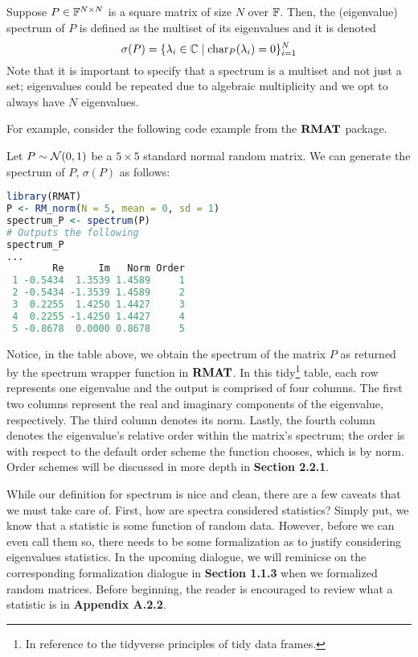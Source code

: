 \bigskip
\bigskip
\begin{definition}[Spectrum]
Suppose $P \in \mathbb{F}^{N \times N}$ is a square matrix of size $N$ over $\mathbb{F}$. Then, the (eigenvalue) spectrum of $P$ is defined as the multiset of its eigenvalues and it is denoted
$$\sigma(P) = \{\lambda_i \in \mathbb{C} \mid \text{char}_P(\lambda_i) = 0 \}_{i=1}^N$$
Note that it is important to specify that a spectrum is a multiset and not just a set; eigenvalues could be repeated due to algebraic multiplicity and we opt to always have $N$ eigenvalues.
\end{definition}

\medskip
For example, consider the following code example from the ${\textbf{RMAT}}$ package.

\begin{code}
Let $P \sim \mathcal{N}(0,1)$ be a $5 \times 5$ standard normal random matrix. We can generate the spectrum of $P$, $\sigma(P)$ as follows:
\end{code}

\begin{lstlisting}[language=R]
library(RMAT)
P <- RM_norm(N = 5, mean = 0, sd = 1)
spectrum_P <- spectrum(P)
# Outputs the following
spectrum_P
...
        Re      Im   Norm Order
 1 -0.5434  1.3539 1.4589     1
 2 -0.5434 -1.3539 1.4589     2
 3  0.2255  1.4250 1.4427     3
 4  0.2255 -1.4250 1.4427     4
 5 -0.8678  0.0000 0.8678     5
\end{lstlisting}

Notice, in the table above, we obtain the spectrum of the matrix $P$ as returned by the spectrum wrapper function in ${\textbf{RMAT}}$.
In this tidy\footnote{In reference to the tidyverse principles of tidy data frames.} table, each row represents one eigenvalue and the output is comprised of four columns.
The first two columns represent the real and imaginary components of the eigenvalue, respectively. The third column denotes its norm. Lastly, the fourth column denotes the eigenvalue's
relative order within the matrix's spectrum; the order is with respect to the default order scheme the function chooses, which is by norm. Order schemes will be discussed in more depth in \textbf{Section 2.2.1}.

\newpage


While our definition for spectrum is nice and clean, there are a few caveats that we must take care of.
First, how are spectra considered statistics? Simply put, we know that a statistic is some function of random data.
However, before we can even call them so, there needs to be some formalization as to justify considering eigenvalues statistics.
In the upcoming dialogue, we will reminicse on the corresponding formalization dialogue in \textbf{Section 1.1.3} when we formalized random matrices.
Before beginning, the reader is encouraged to review what a statistic is in \textbf{Appendix A.2.2}.

